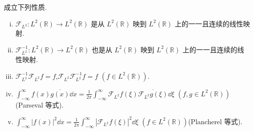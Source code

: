 \begin{theorem}\label{thm:1.2.15}
成立下列性质.
\begin{enumerate}[(i)]
\item $\mathcal{F}_{L^{2}}: L^{2}(\mathbb{R}) \to L^{2}(\mathbb{R})$ 是从 $L^{2}(\mathbb{R})$ 映到 $L^{2}(\mathbb{R})$ 上的一一且连续的线性映射.
\item $\mathcal{F}_{L^{2}}^{-1}: L^{2}(\mathbb{R}) \to L^{2}(\mathbb{R})$ 也是从 $L^{2}(\mathbb{R})$ 映到 $L^{2}(\mathbb{R})$ 上的一一且连续的线性映射.
\item $\mathcal{F}_{L^{2}}^{-1}\mathcal{F}_{L^{2}}f = f$,$\mathcal{F}_{L^{2}}\mathcal{F}_{L^{2}}^{-1}f = f$ $(f \in L^{2}(\mathbb{R}))$.
\item $\int_{-\infty}^{\infty} f(x)\overline{g(x)}\dd x = \frac{1}{2\pi}\int_{-\infty}^{\infty}\mathcal{F}_{L^{2}}f(\xi)\overline{\mathcal{F}_{L^{2}}g(\xi)}\dd \xi$ $(f, g \in L^{2}(\mathbb{R}))$(Parseval 等式).
\item $\int_{-\infty}^{\infty}|f(x)|^{2}\dd x = \frac{1}{2\pi}\int_{-\infty}^{\infty}|\mathcal{F}_{L^{2}}f(\xi)|^{2}\dd \xi$ $(f \in L^{2}(\mathbb{R}))$(Plancherel 等式).
\end{enumerate}
\end{theorem}

